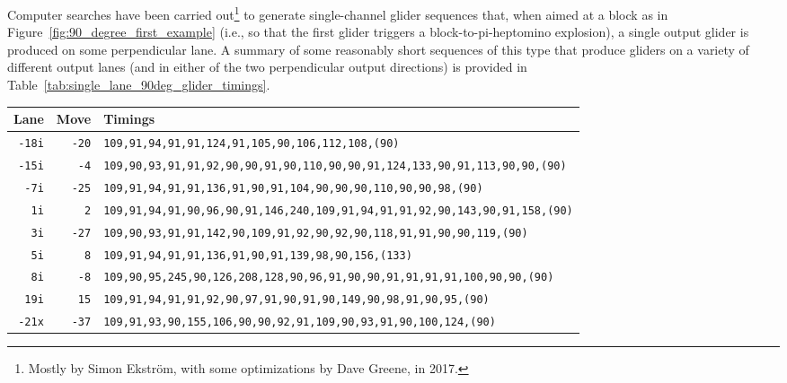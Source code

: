 Computer searches have been carried out\footnote{Mostly by Simon Ekstr{\"o}m, with some optimizations by Dave Greene, in 2017.} to generate single-channel glider sequences that, when aimed at a block as in Figure~\ref{fig:90_degree_first_example} (i.e., so that the first glider triggers a block-to-pi-heptomino explosion), a single output glider is produced on some perpendicular lane. A summary of some reasonably short sequences of this type that produce gliders on a variety of different output lanes (and in either of the two perpendicular output directions) is provided in Table~\ref{tab:single_lane_90deg_glider_timings}.

\begin{table}[!htb]
	\centering
	\begin{tabular}{@{\hskip 0.31cm}L@{\hskip 0.27cm}r@{\hskip 0.27cm}R@{\hskip 0.34cm}}\toprule
		Lane & Move & Timings \\\midrule
		\texttt{-18i} & \texttt{-20} & \footnotesize\texttt{109,91,94,91,91,124,91,105,90,106,112,108,{\color{gray}(90)}}\\
		\texttt{-15i} & \texttt{-4} & \footnotesize\texttt{109,90,93,91,91,92,90,90,91,90,110,90,90,91,124,133,90,91,113,90,90,{\color{gray}(90)}}\\
		\texttt{-7i} & \texttt{-25} & \footnotesize\texttt{109,91,94,91,91,136,91,90,91,104,90,90,90,110,90,90,98,{\color{gray}(90)}}\\
		\texttt{1i} & \texttt{2} & \footnotesize\texttt{109,91,94,91,90,96,90,91,146,240,109,91,94,91,91,92,90,143,90,91,158,{\color{gray}(90)}}\\
		\texttt{3i} & \texttt{-27} & \footnotesize\texttt{109,90,93,91,91,142,90,109,91,92,90,92,90,118,91,91,90,90,119,{\color{gray}(90)}}\\
		\texttt{5i} & \texttt{8} & \footnotesize\texttt{109,91,94,91,91,136,91,90,91,139,98,90,156,{\color{gray}(133)}}\\
		\texttt{8i} & \texttt{-8} & \footnotesize\texttt{109,90,95,245,90,126,208,128,90,96,91,90,90,91,91,91,91,100,90,90,{\color{gray}(90)}}\\
		\texttt{19i} & \texttt{15} & \footnotesize\texttt{109,91,94,91,91,92,90,97,91,90,91,90,149,90,98,91,90,95,{\color{gray}(90)}}\\\midrule
		\texttt{-21x} & \texttt{-37} & \footnotesize\texttt{109,91,93,90,155,106,90,90,92,91,109,90,93,91,90,100,124,{\color{gray}(90)}}\\

\end{tabular}
\end{table}
